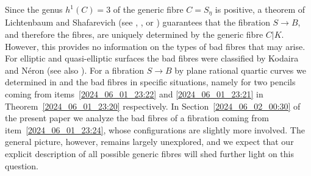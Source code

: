 \documentclass[12pt,reqno]{amsart}
\theoremstyle{definition}
\newcommand{\ov}{\overline}
\begin{document}
Since the genus $h^1(C)=3$ of the generic fibre $C=S_\eta$ is positive,
a theorem of Lichtenbaum and Shafarevich (see \cite[Theorem~4.4]{Lic68}, \cite[p.\,155]{Sha66}, or \cite[p.\,422]{Liu02}) guarantees that the fibration $S\to B$, and therefore the fibres, are uniquely determined by the generic fibre $C|K$.
However, this provides no information on the types of bad fibres that may arise.
For elliptic and quasi-elliptic surfaces the bad fibres were classified by Kodaira \cite{Kod63} and Néron \cite{Ner64} (see also \cite[Chapter~4]{CDL23}).
For a fibration $S\to B$ by plane rational quartic curves we determined in \cite[Section~3]{HiSt22} and \cite[Section~6]{HiSt23} the bad fibres in specific situations, namely for two pencils coming from items~\ref{2024_06_01_23:22} and \ref{2024_06_01_23:21} in Theorem~\ref{2024_06_01_23:20} respectively.
In Section~\ref{2024_06_02_00:30} of the present paper we analyze the bad fibres of a fibration coming from item~\ref{2024_06_01_23:24}, whose configurations are slightly more involved.
The general picture, however, remains largely unexplored, and we expect that our explicit description of all possible generic fibres will shed further light on this question.



\end{document}
